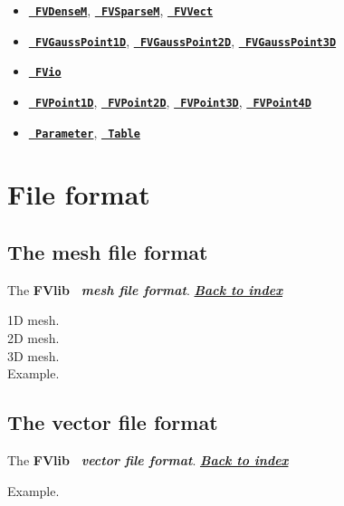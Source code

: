 \documentclass[12pt]{book}
\newcommand{\Index}[0]{{\bf \sl{\color{DodgerBlue} Back to index}}}
\newcommand{\Format}[1]{{\bf \sl{\color{Olive} #1}}}
\newcommand{\Class}[1]{{\bf \tt{\color{magenta} #1}}}
\newcommand{\FVlib}{{\bf FVlib}}
\begin{document}
\begin{itemize}
\item \hyperref[FVDenseM]{\Class{FVDenseM}}, \hyperref[FVSparseM]{\Class{FVSparseM}},
\hyperref[FVVect]{\Class{FVVect}}
\end{itemize}

\begin{itemize}
\item \hyperref[FVGaussPoint1D]{\Class{FVGaussPoint1D}},
\hyperref[FVGaussPoint2D]{\Class{FVGaussPoint2D}},
\hyperref[FVGaussPoint3D]{\Class{FVGaussPoint3D}}
\item \hyperref[FVio]{\Class{FVio}}
\item \hyperref[FVPoint1D]{\Class{FVPoint1D}}, \hyperref[FVPoint2D]{\Class{FVPoint2D}}, 
\hyperref[FVPoint3D]{\Class{FVPoint3D}},  \hyperref[FVPoint4D]{\Class{FVPoint4D}}
\item \hyperref[Parameter]{\Class{Parameter}}, \hyperref[Table]{\Class{Table}}
\end{itemize}
\chapter{File format}
\newpage
\section{The mesh file format}\label{MeshFormat}
\begin{Description*}
The \FVlib\ \Format{mesh file format}.
\hfill \hyperref[MainIndex]{\Index}
\end{Description*}
{\headline 1D mesh.}\\[5pt]

{\headline 2D mesh.}\\[5pt]

{\headline 3D mesh.}\\[5pt]

{\headline Example.}
\newpage
\section{The vector file format}\label{VectorFormat}
\begin{Description*}
The \FVlib\ \Format{vector file format}.
\hfill \hyperref[MainIndex]{\Index}
\end{Description*}

{\headline Example.}
\newpage
\end{document}
